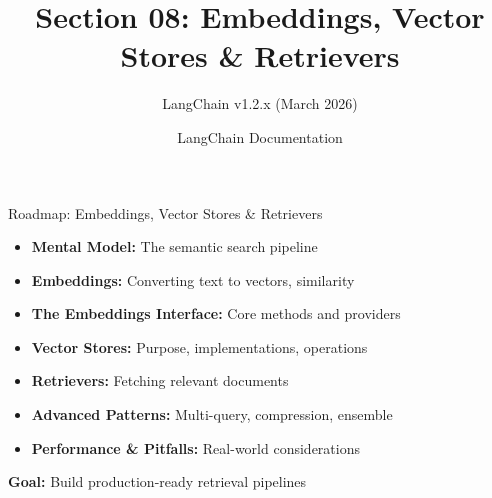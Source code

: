 \documentclass[aspectratio=169,11pt]{beamer}
\title{Section 08: Embeddings, Vector Stores \& Retrievers}
\subtitle{LangChain v1.2.x (March 2026)}
\author{LangChain Documentation}
\date{}
\begin{document}
\begin{frame}
  \titlepage
\end{frame}

\begin{frame}{Roadmap: Embeddings, Vector Stores \& Retrievers}
  \begin{itemize}
    \setlength{\itemsep}{1pt}
    \item \textbf{Mental Model:} The semantic search pipeline
    \item \textbf{Embeddings:} Converting text to vectors, similarity
    \item \textbf{The Embeddings Interface:} Core methods and providers
    \item \textbf{Vector Stores:} Purpose, implementations, operations
    \item \textbf{Retrievers:} Fetching relevant documents
    \item \textbf{Advanced Patterns:} Multi-query, compression, ensemble
    \item \textbf{Performance \& Pitfalls:} Real-world considerations
  \end{itemize}
  \vspace{0.05cm}
  \textcolor{lcblue}{\textbf{Goal:}} Build production-ready retrieval pipelines
\end{frame}
\end{document}

